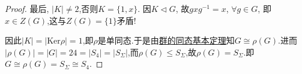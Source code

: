 \documentclass[../../main.tex]{subfiles}%
\begin{document}
\begin{proof}
最后, $|K| \neq 2$,否则$K=\{1,x\}$. 因$K \lhd G$, 故$gxg^{-1}=x$, $\forall g \in G$, 即$x \in Z(G)$,这与$Z(G)=\{1\}$矛盾!

因此$|K|=|\text{Ker}\rho|=1$,即$\rho$是单同态.于是由\hyperref[theorem:群的同态基本定理]{群的同态基本定理}知$G\cong \rho(G)$.进而$|\rho(G)|=|G|=24=|S_4|=|S_\Sigma|$,而$\rho (G)\leqslant S_\Sigma$,故$\rho(G)=S_\Sigma$.即$G\cong \rho(G)=S_\Sigma\cong S_4$.

\end{proof}
\end{document}

